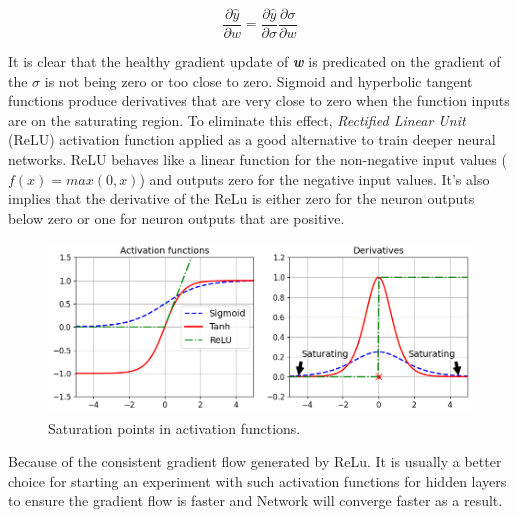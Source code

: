 \begin{equation} \label{eq:chain}
  \frac{\partial{\hat{y}}}{\partial{w}} = \frac{\partial{\hat{y}}}{\partial{\sigma}}  \frac{\partial{\sigma}}{\partial{w}}
\end{equation}

It is clear that the healthy gradient update of \textbf{\textit{w}} is predicated on the gradient of the $\sigma$ is not being zero or too close to zero.
Sigmoid and hyperbolic tangent functions produce derivatives that are very close to zero when the function inputs are on the saturating region. 
To eliminate this effect, \emph{Rectified Linear Unit} (ReLU) activation function applied as a good alternative to train deeper neural networks.
ReLU behaves like a linear function for the non-negative input values ($f(x) = max(0, x)$) and outputs zero for the negative input values.
It's also implies that the derivative of the ReLu is either zero for the neuron outputs below zero or one for neuron outputs that are positive.

\begin{figure}[H]
  \centering
  \includegraphics[width=\textwidth]{img/activation_functions_plot.png}
  \caption{Saturation points in activation functions.}
  \label{fig:saturate}
\end{figure}


Because of the consistent gradient flow generated by ReLu. 
It is usually a better choice for starting an experiment with such activation functions for hidden layers to ensure the gradient flow is faster and Network will converge faster as a result.

